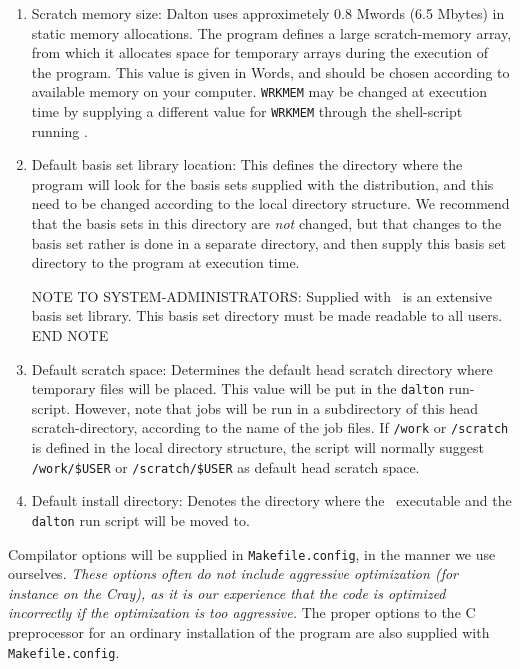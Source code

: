 \begin{enumerate}
\item Scratch memory size: Dalton uses
approximetely 0.8 Mwords (6.5 Mbytes)
in static memory allocations. The program defines a large scratch-memory
array, from which it allocates space for temporary arrays
during the execution of the program. This value is given in Words, and
should be chosen according to available memory on your computer.
\verb|WRKMEM| may be changed at execution time by supplying a
different value for \verb|WRKMEM| through the shell-script running
\siraba .

\item Default basis set library location:
This defines the directory where the program will look for the
basis sets supplied with the distribution, and this need to be
changed according to the local directory structure. We recommend
that the basis sets in this directory are {\em not} changed, but
that changes to the basis set rather is done in a separate
directory, and then supply this basis set directory to the program
at execution time.

{\sc NOTE TO SYSTEM-ADMINISTRATORS:} Supplied with \siraba\ is an
extensive basis set library. This basis set directory must be made
readable to all users. {\sc END NOTE}

\item Default scratch space: Determines the
default head scratch
directory where temporary files will be placed. This value will be put
in the \verb|dalton| run-script. However, note that jobs will be run in
a subdirectory of this head scratch-directory, according to the name
of the job files. If \verb|/work| or \verb|/scratch| is defined in the
local directory structure, the script will normally suggest
\verb|/work/$USER| or  \verb|/scratch/$USER| as default head scratch space.

\item Default install directory: Denotes the directory where the \siraba\
executable and the \verb|dalton| run script will be moved to.
\end{enumerate}

Compilator options will be supplied in \verb|Makefile.config|, in the manner
we use ourselves. {\em These options often do not include aggressive
optimization\index{optimization (f77)} (for instance on the Cray), as
it is our experience that
the code is optimized incorrectly if the optimization is too
aggressive.} The proper options to the C preprocessor for an ordinary
installation of the program are also supplied with \verb|Makefile.config|.

